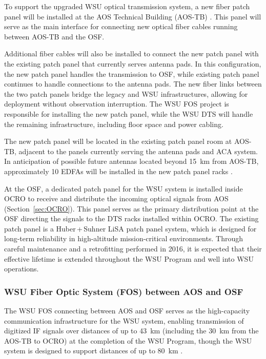 To support the upgraded \ac{WSU} optical transmission system, a new fiber patch panel will be installed at the AOS Technical Building (AOS-TB) \cite{foc_pp_eu, foc_pp_na}.
This panel will serve as the main interface for connecting new optical fiber cables running between \ac{AOS}-TB and the \ac{OSF}.
 
Additional fiber cables will also be installed to connect the new patch panel with the existing patch panel that currently serves antenna pads.
In this configuration, the new patch panel handles the transmission to \ac{OSF}, while existing patch panel continues to handle connections to the antenna pads.
The new fiber links between the two patch panels bridge the legacy and \ac{WSU} infrastructures, allowing for deployment without observation interruption. 
The \acs{WSU} \ac{FOS} project is responsible for installing the new patch panel, while the \acs{WSU} \acs{DTS} will handle the remaining infrastructure, including floor space and power cabling.

The new patch panel will be located in the existing patch panel room at AOS-TB, adjacent to the panels currently serving the antenna pads and \ac{ACA} system.
In anticipation of possible future antennas located beyond 15~km from \ac{AOS}-TB, approximately 10 \acp{EDFA} will be installed in the new patch panel racks \cite{dts_pdr_dsn}.

At the \ac{OSF}, a dedicated patch panel for the \ac{WSU} system is installed inside \ac{OCRO} to receive  and distribute the incoming optical signals from \ac{AOS} \cite{foc_pp_na} (Section~\ref{sec:OCRO}).
This panel serves as the primary distribution point at the \ac{OSF} directing the signals to the \ac{DTS} racks installed within \ac{OCRO}. The existing patch panel is a Huber\,+\,Suhner LiSA patch panel system, which is designed for long-term reliability in high-altitude mission-critical environments. Through careful maintenance and a retrofitting performed in 2016, it is expected that their effective lifetime is extended throughout the WSU Program and well into WSU operations.

\subsubsection{WSU Fiber Optic System (FOS) between AOS and OSF}
\label{sec:FOS}

The \ac{WSU} \ac{FOS} connecting between \ac{AOS} and \ac{OSF} serves as the high-capacity communication infrastructure for the \ac{WSU} system, enabling transmission of digitized \acs{IF} signals over distances of up to 43~km (including the 30~km from the \ac{AOS}-TB to \ac{OCRO}) at the completion of the WSU Program, though the \ac{WSU} system is designed to support distances of up to 80~km \cite{foc_pp_eu} \cite{foc_pp_na}.

